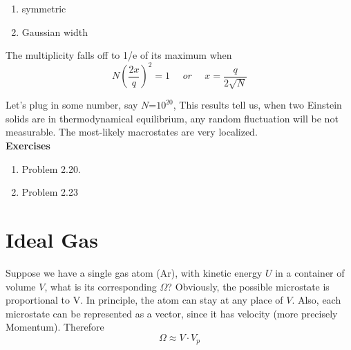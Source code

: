 \begin{enumerate}
\item symmetric
\item Gaussian width
\end{enumerate}



The multiplicity falls off to 1/e of its maximum when 
\begin{equation}
  N(\frac{2x}{q})^2 = 1 ~~~~~~or~~~~~~ x = \frac{q}{2\sqrt{N}}
\end{equation}

Let's plug in some number, say $N$=\textrm {$10^{20}$}, 
This results tell us,
when two Einstein solids are in thermodynamical equilibrium, any random fluctuation
will be not measurable. The most-likely macrostates are very localized.\\
{\bf Exercises}
\begin{enumerate}
\item Problem 2.20. 
\item Problem 2.23
\end{enumerate}

\section{Ideal Gas}
Suppose we have a single gas atom (Ar), with kinetic energy $U$ in a container of volume $V$, what is its corresponding $\Omega$?
Obviously, the possible microstate is proportional to V. In principle, the atom can stay at any place of $V$.
Also, each microstate can be represented as a vector, since it has velocity (more precisely Momentum). 
Therefore
\begin{equation}
\Omega \approx V\cdot V_p
\end{equation}



